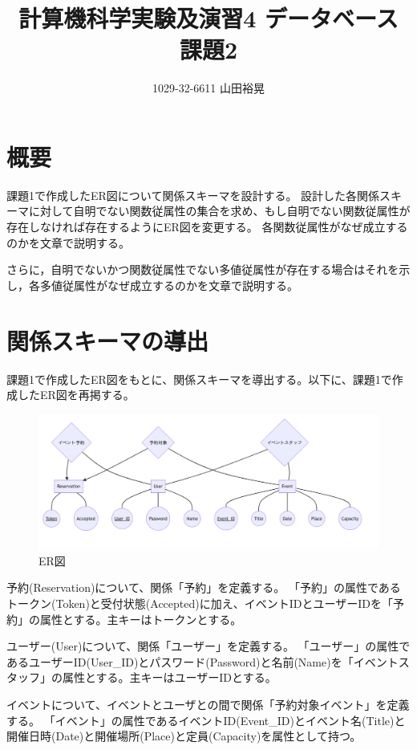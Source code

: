 \documentclass[dvipdfmx]{jarticle}
\begin{document}
\title{計算機科学実験及演習4 データベース 課題2}
\author{1029-32-6611 山田裕晃}
\maketitle

\section{概要}
課題1で作成したER図について関係スキーマを設計する。
設計した各関係スキーマに対して自明でない関数従属性の集合を求め、もし自明でない関数従属性が存在しなければ存在するようにER図を変更する。
各関数従属性がなぜ成立するのかを文章で説明する。

さらに，自明でないかつ関数従属性でない多値従属性が存在する場合はそれを示し，各多値従属性がなぜ成立するのかを文章で説明する。

\section{関係スキーマの導出}
課題1で作成したER図をもとに、関係スキーマを導出する。以下に、課題1で作成したER図を再掲する。
\begin{figure}[H]
  \centering
  \includegraphics[scale=0.4]{ermodel.png}
  \caption{ER図}
\end{figure}

予約(Reservation)について、関係「予約」を定義する。
「予約」の属性であるトークン(Token)と受付状態(Accepted)に加え、イベントIDとユーザーIDを「予約」の属性とする。主キーはトークンとする。

ユーザー(User)について、関係「ユーザー」を定義する。
「ユーザー」の属性であるユーザーID(User\_ID)とパスワード(Password)と名前(Name)を「イベントスタッフ」の属性とする。主キーはユーザーIDとする。

イベントについて、イベントとユーザとの間で関係「予約対象イベント」を定義する。
「イベント」の属性であるイベントID(Event\_ID)とイベント名(Title)と開催日時(Date)と開催場所(Place)と定員(Capacity)を属性として持つ。
\end{document}
